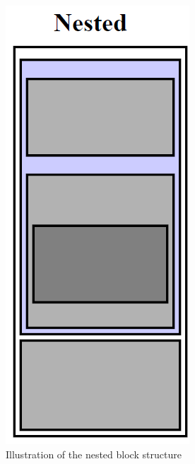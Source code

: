 	\begin{figure}
		\begin{center}
			\includegraphics[scale=1]{rapport/2/figures/nested_block_structure}
		\end{center}	
		\caption{Illustration of the nested block structure }
	\end{figure}
	
	
	
	
	
	
	
	
	
	
